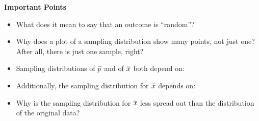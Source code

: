 {\bf Important Points}
\begin{itemize}
\item What does it mean to say that an outcome is ``random''?\vfill
\item Why does a plot of a sampling distribution show many points, not
  just one? After all, there is just one sample, right?\vfill
\item Sampling distributions of $\widehat{p}$ and of $\overline{x}$ both depend on:
  \vfill
\item Additionally, the sampling distribution for $\overline{x}$ depends
  on:\vfill
\item Why is the sampling distribution for $\overline{x}$ less spread out
  than the distribution of the original data?
\end{itemize}



